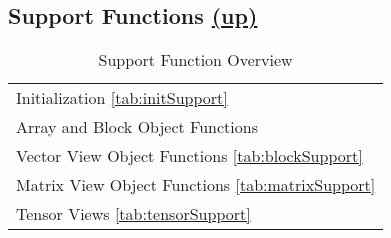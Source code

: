 \subsection*{Support Functions \hyperlink{VSIPspecHead}{(up)}}
\begin{table}[H]
\hypertarget{vsiplAPISupport}{}
\caption{Support Function Overview}
\label{tab:vsiplAPISupport}
\begin{center}
\begin{tabular}{l}
Initialization \ref{tab:initSupport}\\
Array and Block Object Functions \\
Vector View Object Functions \ref{tab:blockSupport}\\
Matrix View Object Functions \ref{tab:matrixSupport}\\
Tensor Views \ref{tab:tensorSupport}\\
\end{tabular}
\end{center}
\label{default}
\end{table}%
